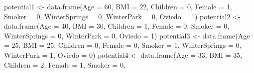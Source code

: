 \documentclass[
]{article}
\newenvironment{Shaded}{\begin{snugshade}}{\end{snugshade}}
\newcommand{\AttributeTok}[1]{\textcolor[rgb]{0.77,0.63,0.00}{#1}}
\newcommand{\DecValTok}[1]{\textcolor[rgb]{0.00,0.00,0.81}{#1}}
\newcommand{\FunctionTok}[1]{\textcolor[rgb]{0.00,0.00,0.00}{#1}}
\newcommand{\NormalTok}[1]{#1}
\newcommand{\OtherTok}[1]{\textcolor[rgb]{0.56,0.35,0.01}{#1}}
\begin{document}
\begin{Shaded}
\begin{Highlighting}[]
\NormalTok{potential1 }\OtherTok{\textless{}{-}} \FunctionTok{data.frame}\NormalTok{(}\AttributeTok{Age =} \DecValTok{60}\NormalTok{,}
                            \AttributeTok{BMI =} \DecValTok{22}\NormalTok{,}
                            \AttributeTok{Children =} \DecValTok{0}\NormalTok{,}
                            \AttributeTok{Female =} \DecValTok{1}\NormalTok{,}
                            \AttributeTok{Smoker =} \DecValTok{0}\NormalTok{,}
                            \AttributeTok{WinterSprings =} \DecValTok{0}\NormalTok{,}
                            \AttributeTok{WinterPark =} \DecValTok{0}\NormalTok{,}
                            \AttributeTok{Oviedo =} \DecValTok{1}\NormalTok{)}
\NormalTok{potential2 }\OtherTok{\textless{}{-}} \FunctionTok{data.frame}\NormalTok{(}\AttributeTok{Age =} \DecValTok{40}\NormalTok{,}
                            \AttributeTok{BMI =} \DecValTok{30}\NormalTok{,}
                            \AttributeTok{Children =} \DecValTok{1}\NormalTok{,}
                            \AttributeTok{Female =} \DecValTok{0}\NormalTok{,}
                            \AttributeTok{Smoker =} \DecValTok{0}\NormalTok{,}
                            \AttributeTok{WinterSprings =} \DecValTok{0}\NormalTok{,}
                            \AttributeTok{WinterPark =} \DecValTok{0}\NormalTok{,}
                            \AttributeTok{Oviedo =} \DecValTok{1}\NormalTok{)}
\NormalTok{potential3 }\OtherTok{\textless{}{-}} \FunctionTok{data.frame}\NormalTok{(}\AttributeTok{Age =} \DecValTok{25}\NormalTok{,}
                            \AttributeTok{BMI =} \DecValTok{25}\NormalTok{,}
                            \AttributeTok{Children =} \DecValTok{0}\NormalTok{,}
                            \AttributeTok{Female =} \DecValTok{0}\NormalTok{,}
                            \AttributeTok{Smoker =} \DecValTok{1}\NormalTok{,}
                            \AttributeTok{WinterSprings =} \DecValTok{0}\NormalTok{,}
                            \AttributeTok{WinterPark =} \DecValTok{1}\NormalTok{,}
                            \AttributeTok{Oviedo =} \DecValTok{0}\NormalTok{)}
\NormalTok{potential4 }\OtherTok{\textless{}{-}} \FunctionTok{data.frame}\NormalTok{(}\AttributeTok{Age =} \DecValTok{33}\NormalTok{,}
                            \AttributeTok{BMI =} \DecValTok{35}\NormalTok{,}
                            \AttributeTok{Children =} \DecValTok{2}\NormalTok{,}
                            \AttributeTok{Female =} \DecValTok{1}\NormalTok{,}
                            \AttributeTok{Smoker =} \DecValTok{0}\NormalTok{,}

\end{Highlighting}
\end{Shaded}
\end{document}
